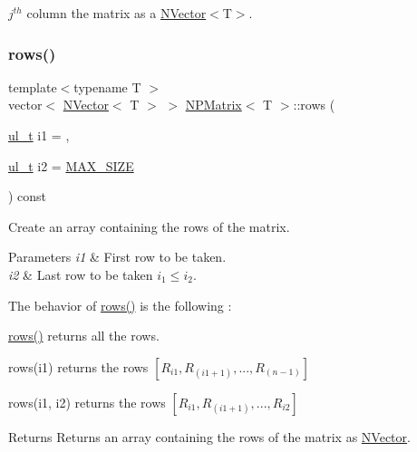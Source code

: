 $ j^{th} $ column the matrix as a {\ttfamily \mbox{\hyperlink{class_n_vector}{N\+Vector}}$<$T$>$}. 

\mbox{\label{class_n_p_matrix_add861e9e1df81af2546c3eab1fd40d51}} 
\subsubsection{\texorpdfstring{rows()}{rows()}}
{\footnotesize\ttfamily template$<$typename T $>$ \\
vector$<$ \mbox{\hyperlink{class_n_vector}{N\+Vector}}$<$ T $>$ $>$ \mbox{\hyperlink{class_n_p_matrix}{N\+P\+Matrix}}$<$ T $>$\+::rows (\begin{DoxyParamCaption}\item[{\mbox{\hyperlink{group___n_algebra_ga1b140a2034db3f5dfe18a987745df43a}{ul\+\_\+t}}}]{i1 = {},  }\item[{\mbox{\hyperlink{group___n_algebra_ga1b140a2034db3f5dfe18a987745df43a}{ul\+\_\+t}}}]{i2 = {\ttfamily \mbox{\hyperlink{_n_vector_8h_a0592dba56693fad79136250c11e5a7fe}{M\+A\+X\+\_\+\+S\+I\+ZE}}} }\end{DoxyParamCaption}) const}



Create an array containing the rows of the matrix. 


\begin{DoxyParams}{Parameters}
{\em i1} & First row to be taken. \\
\hline
{\em i2} & Last row to be taken $ i_1 \leq i_2 $.\\
\hline
\end{DoxyParams}
The behavior of {\ttfamily \mbox{\hyperlink{class_n_p_matrix_add861e9e1df81af2546c3eab1fd40d51}{rows()}}} is the following \+:
\begin{DoxyItemize}
\item {\ttfamily \mbox{\hyperlink{class_n_p_matrix_add861e9e1df81af2546c3eab1fd40d51}{rows()}}} returns all the rows.
\item {\ttfamily rows(i1)} returns the rows $ [R_{i1}, R_{(i1+1)},..., R_{(n-1)}] $
\item {\ttfamily rows(i1, i2)} returns the rows $ [R_{i1}, R_{(i1+1)},..., R_{i2}] $
\end{DoxyItemize}

\begin{DoxyReturn}{Returns}
Returns an array containing the rows of the matrix as {\ttfamily \mbox{\hyperlink{class_n_vector}{N\+Vector}}}. 
\end{DoxyReturn}
\mbox{\label{class_n_p_matrix_a30c8ad7b415fa92a23375cbad3ee8e37}} 
